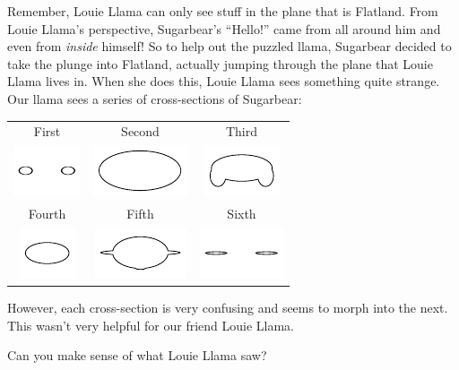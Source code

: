 Remember, Louie Llama can only see stuff in the plane that is
Flatland. From Louie Llama's perspective, Sugarbear's ``Hello!''  came
from all around him and even from \textit{inside} himself!  So to help
out the puzzled llama, Sugarbear decided to take the plunge into
Flatland, actually jumping through the plane that Louie Llama lives
in. When she does this, Louie Llama sees something quite strange. Our
llama sees a series of cross-sections of Sugarbear:
\begin{center}
\begin{tabular}{|c|c|c|}
\hline
First & Second & Third\\
\includegraphics{../graphics/sugarbearCrossSections1.pdf} 
& \includegraphics{../graphics/sugarbearCrossSections2.pdf} 
& \includegraphics{../graphics/sugarbearCrossSections3.pdf} 
\\
\hline 
Fourth & Fifth & Sixth\\
\includegraphics{../graphics/sugarbearCrossSections4.pdf} 
& \includegraphics{../graphics/sugarbearCrossSections5.pdf} 
& \includegraphics{../graphics/sugarbearCrossSections6.pdf} 
\\
\hline
\end{tabular}
\end{center}

However, each cross-section is very confusing and seems to morph into
the next. This wasn't very helpful for our friend Louie Llama.
\begin{ques}
Can you make sense of what Louie Llama saw?
\end{ques}
\QM 


